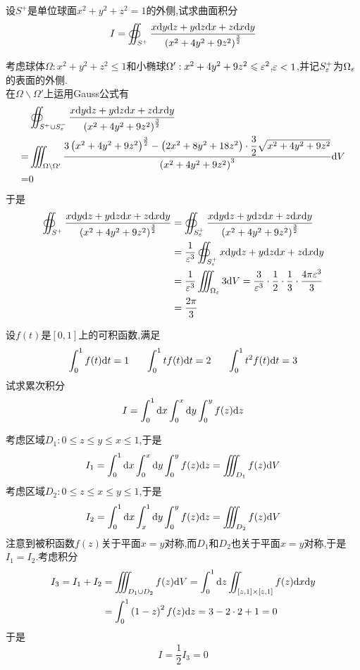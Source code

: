 \documentclass{ctexart}
\begin{document}
\begin{problem}[4.(12\songti{分})]
    设$S^+$是单位球面$x^2+y^2+z^2=1$的外侧,试求曲面积分
    \[I=\oiint_{S^+}\dfrac{x\mathrm{d} y\mathrm{d} z+y\mathrm{d} z\mathrm{d} x+z\mathrm{d} x\mathrm{d} y}{\left(x^2+4y^2+9z^2\right)^{\frac32}}\]  
\end{problem}
\begin{solution}
    考虑球体$\Omega:x^2+y^2+z^2\leqslant 1$和小椭球$\Omega':x^2+4y^2+9z^2\leqslant\varepsilon^2$,$\varepsilon<1$,并记$S_\varepsilon^+$为$\Omega_\varepsilon$的表面的外侧.\\
    在$\Omega\backslash\Omega'$上运用Gauss公式有
    \[\begin{aligned}
        &\oiint_{S^+\cup S_\varepsilon^-}\dfrac{x\mathrm{d} y\mathrm{d} z+y\mathrm{d} z\mathrm{d} x+z\mathrm{d} x\mathrm{d} y}{\left(x^2+4y^2+9z^2\right)^{\frac32}}\\
        =&\iiint_{\Omega\backslash\Omega'}\dfrac{3\left(x^2+4y^2+9z^2\right)^{\frac32}-\left(2x^2+8y^2+18z^2\right)\cdot\dfrac{3}{2}\sqrt{x^2+4y^2+9z^2}}{\left(x^2+4y^2+9z^2\right)^3}\mathrm{d} V \\
        =&0
    \end{aligned}\]
    于是
    \[\begin{aligned}
        \oiint_{S^+}\dfrac{x\mathrm{d} y\mathrm{d} z+y\mathrm{d} z\mathrm{d} x+z\mathrm{d} x\mathrm{d} y}{\left(x^2+4y^2+9z^2\right)^{\frac32}}
        &= \oiint_{S_\varepsilon^+}\dfrac{x\mathrm{d} y\mathrm{d} z+y\mathrm{d} z\mathrm{d} x+z\mathrm{d} x\mathrm{d} y}{\left(x^2+4y^2+9z^2\right)^{\frac32}} \\
        &= \dfrac{1}{\varepsilon^3}\oiint_{S_\varepsilon^+}x\mathrm{d} y\mathrm{d} z+y\mathrm{d} z\mathrm{d} x+z\mathrm{d} x\mathrm{d} y \\
        &= \dfrac{1}{\varepsilon^3}\iiint_{\Omega_\varepsilon}3\mathrm{d} V = \dfrac{3}{\varepsilon^3}\cdot\dfrac{1}{2}\cdot\dfrac{1}{3}\cdot\dfrac{4\pi\varepsilon^3}{3} \\
        &= \dfrac{2\pi}{3}
    \end{aligned}\]

\end{solution}
\begin{problem}[5.(12\songti{分})]
    设$f(t)$是$[0,1]$上的可积函数,满足
    \[\int_0^1f(t)\di t=1\ \ \ \ \ \int_0^1tf(t)\di t=2\ \ \ \ \ \int_0^1t^2f(t)\di t=3\]
    试求累次积分
    \[I=\int_0^1\mathrm{d} x\int_0^x\mathrm{d} y\int_0^yf(z)\mathrm{d} z\]

\end{problem}
\begin{solution}
    考虑区域$D_1:0\leqslant z\leqslant y\leqslant x\leqslant 1$,于是
    \[I_1=\int_0^1\mathrm{d} x\int_0^x\mathrm{d} y\int_0^yf(z)\mathrm{d} z=\iiint_{D_1}f(z)\mathrm{d} V\]
    考虑区域$D_2:0\leqslant z\leqslant x\leqslant y\leqslant 1$,于是
    \[I_2=\int_0^1\mathrm{d} x\int_x^1\mathrm{d} y\int_0^y f(z)\mathrm{d} z=\iiint_{D_2}f(z)\mathrm{d} V\]
    注意到被积函数$f(z)$关于平面$x=y$对称,而$D_1$和$D_2$也关于平面$x=y$对称,于是$I_1=I_2$.考虑积分
    \[\begin{aligned}
        I_3=I_1+I_2
        &= \iiint_{D_1\cup D_2}f(z)\mathrm{d} V = \int_0^1\mathrm{d} z\iint_{[z,1]\times[z,1]}f(z)\mathrm{d} x\mathrm{d} y \\
        &= \int_0^1\left(1-z\right)^2f(z)\mathrm{d} z = 3-2\cdot 2+1=0
    \end{aligned}\]
    于是
    \[I=\dfrac12I_3=0\]

\end{solution}
\end{document}
